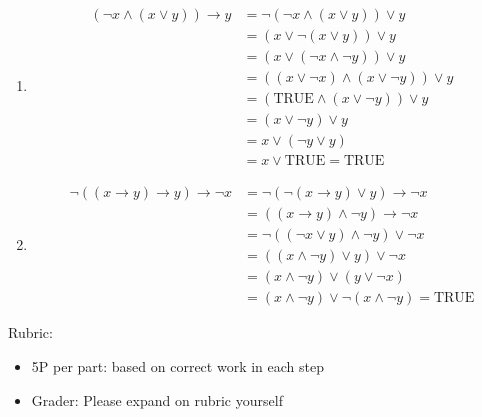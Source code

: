 \documentclass{article}
\theoremstyle{definition}
\begin{document}
\begin{solution}
\begin{enumerate}
        \item
        \begin{align*}
            (\neg x \wedge (x \vee y)) \rightarrow y
            &=\neg(\neg x \wedge (x \vee y)) \vee y
          \\&=(x \vee \neg(x \vee y)) \vee y 
          \\&=(x \vee (\neg x \wedge \neg y)) \vee y 
          \\ &=((x \vee \neg x) \wedge ( x \vee \neg y)) \vee y 
          \\ &=(\mathrm{TRUE} \wedge ( x \vee \neg y)) \vee y 
          \\ &=( x \vee \neg y) \vee y 
          \\ &= x \vee (\neg y \vee y )
          \\ &=x \vee \mathrm{TRUE} = \mathrm{TRUE}
        \end{align*}
        \item
        \begin{align*}
            \neg ( (x \rightarrow y) \rightarrow  y) \rightarrow \neg x
            &= \neg ( \neg (x \rightarrow y) \vee  y) \rightarrow \neg x
          \\&= ( (x \rightarrow y) \wedge  \neg y) \rightarrow \neg x
          \\&= \neg ( (\neg x \vee y) \wedge  \neg y) \vee \neg x
          \\&= ( (x \wedge \neg y) \vee   y) \vee \neg x
          \\&= (x \wedge \neg y) \vee   (y \vee \neg x)
          \\&= (x \wedge \neg y) \vee  \neg (x \wedge \neg y) = \mathrm{TRUE}
        \end{align*}
    \end{enumerate}
{\color{red} Rubric:
\begin{itemize}
\item 5P per part: based on correct work in each step
\item Grader: Please expand on rubric yourself
\end{itemize}}
\end{solution}
\end{document}
